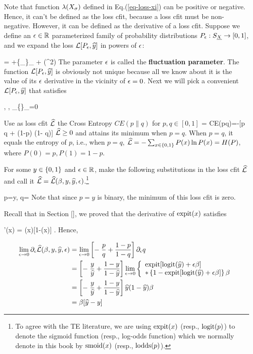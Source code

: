 Note that function $\lambda(X_\sigma)$ defined in Eq.(\ref{eq-loss-xi})
can be positive or negative. Hence,
 it can't be defined as the loss cfit,
because a loss cfit must be non-negative. However, it can be
defined as the derivative of a loss cfit. Suppose we define an $\epsilon\in{ \mathbb{R}}$
parameterized
family of probability distributions $P_\epsilon:S_{\underline{X}}\rightarrow [0,1]$,
and we expand the loss ${\cal L}[P_\epsilon, {\widehat{y}}]$
in powers of $\epsilon$:

\beq
{} = \call[P_0, \haty]
+\eps \{\partial_\eps {}\}_{} + \calo(\eps^2)
\eeq
The parameter $\epsilon$ is called the {\bf fluctuation parameter}.
The function ${\cal L}[P_\epsilon, {\widehat{y}}]$ is obviously
not unique because all we know about it
is the value of its $\epsilon$ derivative
in the vicinity of $\epsilon=0$. Next we will pick a convenient
${\cal L}[P_\epsilon, {\widehat{y}}]$ that satisfies

\beq
{},\quad
{}, \quad \partial_\eps \{\}_{}=0
\eeq


Use as loss cfit $\widehat{{\cal L}}$ the Cross Entropy
$CE(p\parallel q)$ for $p, q\in [0,1]$
\beq
\hatl = CE(p\parallel q)=-[p \ln q + (1-p) \ln(1- q)]
\eeq
$\widehat{{\cal L}}\geq 0$ and attains its minimum when $p=q$.
When $p=q$, it equals the entropy of $p$,
i.e., when $p=q$, $\widehat{{\cal L}}=-\sum_{x\in \{0,1\}} P(x)\ln P(x)= H(P)$,
where $P(0)=p, P(1)=1-p$.

For some $y\in\{0,1\}$ and $\epsilon\in{ \mathbb{R}}$,
make the following
substitutions
in the loss cfit $\widehat{{\cal L}}$
and call it $\widehat{{\cal L}}=\widehat{{\cal L}}(\beta, y, {\widehat{y}}, \epsilon)$.\footnote{To
agree with the TE literature,
we are using ${\rm expit}(x)$
(resp., ${\rm logit}(p)$) to denote
the sigmoid function (resp., log-odds function)
which we normally
denote in this book by
 ${\rm smoid}(x)$ (resp., ${\rm lodds}(p)$).}

\beq
p=y,
\quad
q= \expit[\logit(\haty) + \eps \beta ]
\eeq
Note that since $p=y$ is binary,
the minimum of this loss cfit is zero.


 Recall that in Section [], we proved that
 the derivative of ${\rm expit}(x)$ satisfies

\beq
\expit'(x) = \expit(x)[1-\expit(x)]
\;.
\eeq
Hence,

\begin{align}
\lim_{\epsilon\rightarrow 0}\partial_\epsilon \widehat{{\cal L}}(\beta, y, {\widehat{y}}, \epsilon)
&=
\lim_{\epsilon\rightarrow 0}
\left[-\;\frac{p}{q} + \frac{1-p}{1-q}\right]\partial_\epsilon q
\\
&=
\left[-\;\frac{y}{{\widehat{y}}} + \frac{1-y}{1-{\widehat{y}}}\right]
\lim_{\epsilon\rightarrow 0}
\left\{
\begin{array}{l}
{\rm expit}[{\rm logit}({\widehat{y}}) + \epsilon \beta ]
\\
*\left\{1-{\rm expit}[{\rm logit}({\widehat{y}}) + \epsilon \beta ]\right\}
\beta
\end{array}
\right.
\\
&=
\left[-\;\frac{y}{{\widehat{y}}} + \frac{1-y}{1-{\widehat{y}}}\right]
{\widehat{y}}(1-{\widehat{y}})\beta
\\
&=
\beta[{\widehat{y}}-y]
\end{align}

